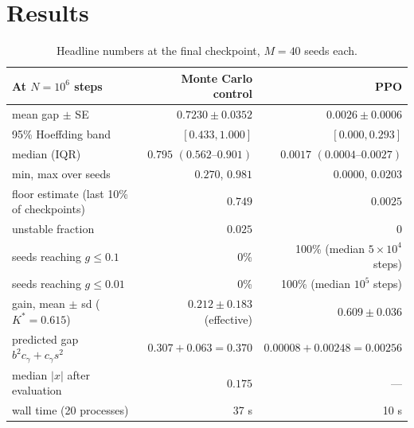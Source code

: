 \documentclass[11pt]{article}
\begin{document}
\section{Results}
\label{sec:results}

\begin{table}[H]
  \centering
  \begin{tabular}{@{}lrr@{}}
    \toprule
    At $N = 10^6$ steps & Monte Carlo control & PPO \\
    \midrule
    mean gap $\pm$ SE & $0.7230 \pm 0.0352$ & $0.0026 \pm 0.0006$ \\
    95\% Hoeffding band & $[0.433, 1.000]$ & $[0.000, 0.293]$ \\
    median (IQR) & $0.795$ $(0.562\text{--}0.901)$ & $0.0017$ $(0.0004\text{--}0.0027)$ \\
    min, max over seeds & $0.270$, $0.981$ & $0.0000$, $0.0203$ \\
    floor estimate (last 10\% of checkpoints) & $0.749$ & $0.0025$ \\
    unstable fraction & $0.025$ & $0$ \\
    seeds reaching $g \le 0.1$ & 0\% & 100\% (median $5 \times 10^4$ steps) \\
    seeds reaching $g \le 0.01$ & 0\% & 100\% (median $10^5$ steps) \\
    gain, mean $\pm$ sd ($K^* = 0.615$) & $0.212 \pm 0.183$ (effective) & $0.609 \pm 0.036$ \\
    predicted gap $b^2 c_\gamma + c_\gamma s^2$ & $0.307 + 0.063 = 0.370$ & $0.00008 + 0.00248 = 0.00256$ \\
    median $|x|$ after evaluation & $0.175$ & --- \\
    wall time (20 processes) & 37 s & 10 s \\
    \bottomrule
  \end{tabular}
  \caption{Headline numbers at the final checkpoint, $M = 40$ seeds each.}
  \label{tab:results}
\end{table}
\end{document}
